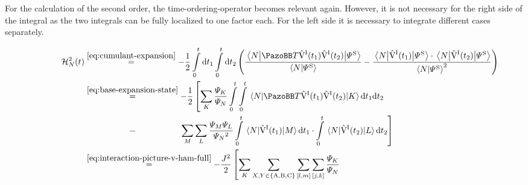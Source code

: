 For the calculation of the second order, the time-ordering-operator becomes relevant again. 
However, it is not necessary for the right side of the integral as the two integrals can be fully localized to one factor each.
For the left side it is necessary to integrate different cases separately.

\vspace{-0.2cm} %

\begin{equation}
    \label{eq:hn-integrated-second-order}
    \begin{split}
        \HNOftOrder{2} &\stackrel{\ref{eq:cumulant-expansion}}{=} - \frac{1}{2} \int\limits_0^t\mathrm{d}t_1 \int\limits_0^t\mathrm{d}t_2
        \left(
        \frac{\bracketHelper{N}{\timeOrderingOperator
        \VhamiltonianOf[\interactionPicture]{t_1}\VhamiltonianOf[\interactionPicture]{t_2}
        }{\picturePsi[\schroedingerPicture]{}}}{\braketHelper{N}{\picturePsi[\schroedingerPicture]{}}} -  \frac{\bracketHelper{N}{\VhamiltonianOf[\interactionPicture]{t_1}}{\picturePsi[\schroedingerPicture]{}} \cdot \bracketHelper{N}{\VhamiltonianOf[\interactionPicture]{t_2}}{\picturePsi[\schroedingerPicture]{}}}{\braketHelper{N}{\picturePsi[\schroedingerPicture]{}}^2}
        \right)
        \hspace{-1.3cm} %
        \\
        &\stackrel{\ref{eq:base-expansion-state}}{=}
        - \frac{1}{2} 
        \left[
        \lsum[K] \frac{\psiN[K]}{\psiN} \int\limits_0^t \int\limits_0^t        \bracketHelper{N}{\timeOrderingOperator
        \VhamiltonianOf[\interactionPicture]{t_1}\VhamiltonianOf[\interactionPicture]{t_2}
        }{K}            \mathrm{d}t_1\mathrm{d}t_2 \right. \\
        &\stackrel{\phantom{\ref{eq:base-expansion-state}}}{-} 
        \left.
        \lsum[M]\lsum[L]
        \frac{\psiN[M]\psiN[L]}{\psiN{}^2}
        \int\limits_0^t \bracketHelper{N}{\VhamiltonianOf[\interactionPicture]{t_1}}{M}  \mathrm{d}t_1
        \cdot
        \int\limits_0^t \bracketHelper{N}{\VhamiltonianOf[\interactionPicture]{t_2}}{L}  \mathrm{d}t_2 \right]\\
        &\stackrel{\ref{eq:interaction-picture-v-ham-full}}{=}
        - \frac{J^2}{2} 
        \left[
        \lsum[K]\lsum[X,Y \in \left\{\text{A}, \text{B}, \text{C}\right\}] \fullneighborsum{l}{m}\fullneighborsum{j}{k}
        \frac{\psiN[K]}{\psiN} \right. \\&\quad

\end{split}
\end{equation}
